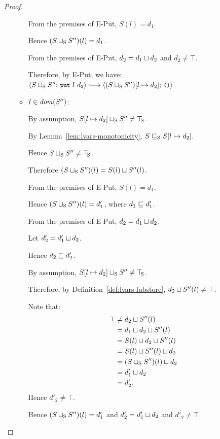\begin{proof}
\begin{itemize}
\begin{itemize}
      From the premises of {\sc E-Put}, $S(l) = d_1$.

      Hence $(S \sqcup_{\mathrm{S}} S'')(l) = d_1$.

      From the premises of {\sc E-Put}, $d_2 = d_1 \sqcup d_2$
      and $d_2 \neq \top$.

      Therefore, by {\sc E-Put}, we have:
      $\config{\lubstore{S}{S''}}{\putexp{l}{d_2}} \parstepsto
      \config{\extSRaw{(\lubstore{S}{S''})}{l}{d_2}}{\unit}$.

    \item $l \in \mathit{dom}(S'')$:

      By assumption, $S[l \mapsto d_2] \sqcup_{\mathrm{S}} S'' \neq \top\hspace{-0.85mm}_{\mathrm{S}}$.

      By Lemma~\ref{lem:lvars-monotonicity},
      $S \sqsubseteq_{\mathrm{S}} S[l \mapsto d_2]$.

      Hence $S \sqcup_{\mathrm{S}} S'' \neq \top\hspace{-0.85mm}_{\mathrm{S}}$.

      Therefore $(S \sqcup_{\mathrm{S}} S'')(l) = S(l) \sqcup S''(l)$.

      From the premises of {\sc E-Put}, $S(l) = d_1$.
      
      Hence $(S \sqcup_{\mathrm{S}} S'')(l) = d'_1$, where $d_1 \sqsubseteq
      d'_1$.

      From the premises of {\sc E-Put}, $d_2 = d_1 \sqcup d_2$.

      Let $d'_2 = d'_1 \sqcup d_2$.

      Hence $d_2 \sqsubseteq d'_2$.

      By assumption, $S[l \mapsto d_2] \sqcup_{\mathrm{S}} S'' \neq \top\hspace{-0.85mm}_{\mathrm{S}}$.

      Therefore, by Definition~\ref{def:lvars-lubstore},
      $d_2 \sqcup S''(l) \neq \top$.

      Note that:
      \begin{align*}
        \top &\neq d_2 \sqcup S''(l) \\ &=
        d_1 \sqcup d_2 \sqcup S''(l) \\ &=
        S(l) \sqcup d_2 \sqcup S''(l) \\ &=
        S(l) \sqcup S''(l) \sqcup d_2 \\ &=
        (S \sqcup_{\mathrm{S}} S'')(l) \sqcup d_2 \\ &=
        d'_1 \sqcup d_2 \\ &= d'_2.
      \end{align*}
      Hence $d'_2 \neq \top$.

      Hence $(S \sqcup_{\mathrm{S}} S'')(l) = d'_1$ and $d'_2 =
      d'_1 \sqcup d_2$ and $d'_2 \neq \top$.


\end{itemize}
\end{itemize}
\end{proof}
